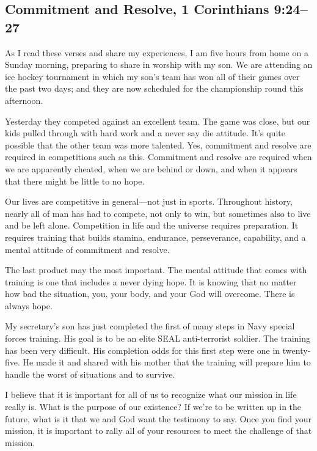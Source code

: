 \documentclass[12pt]{memoir}
\begin{document}
\subsection[Commitment and Resolve]{Commitment and Resolve, 1 Corinthians 9:24--27}

As I read these verses and share my experiences, I am five hours from
home on a Sunday morning, preparing to share in worship with my son.
We are attending an ice hockey tournament in which my son's team
has won all of their games over the past two days; and they are now
scheduled for the championship round this afternoon.

Yesterday they competed against an excellent team. The game was close,
but our kids pulled through with hard work and a never say
die attitude. It's quite possible that the other team was more
talented. Yes, commitment and resolve are required in competitions
such as this. Commitment and resolve are required when we are apparently
cheated, when we are behind or down, and when it appears
that there might be little to no hope.

Our lives are competitive in general---not just in sports. Throughout
history, nearly all of man has had to compete, not only to win, but
sometimes also to live and be left alone. Competition in life and the universe requires preparation. It requires training that builds stamina, endurance, perseverance, capability, and a mental attitude of commitment and resolve.

The last product may the most important. The mental attitude that
comes with training is one that includes a never dying hope. It is
knowing that no matter how bad the situation, you, your body,
and your God will overcome. There is always hope. 

My secretary's son has just completed the first of many steps in Navy
special forces training. His goal is to be an elite \textsc{SEAL} anti-terrorist
soldier. The training has been very difficult. His completion odds
for this first step were one in twenty-five. He made it and shared
with his mother that the training will prepare him to handle the worst
of situations and to survive.

I believe that it is important for all of us to recognize what our
mission in life really is. What is the purpose of our existence? If
we're to be written up in the future, what is it that we and God want
the testimony to say. Once you find your mission, it is important
to rally all of your resources to meet the challenge of that mission.
\end{document}
